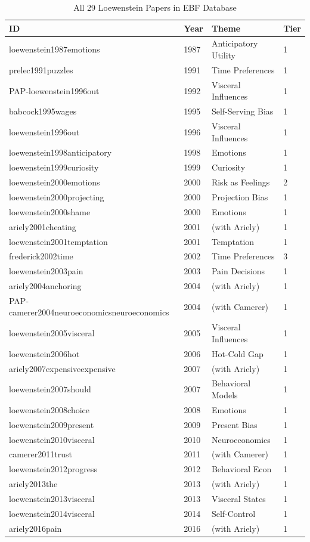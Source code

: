 \begin{table}[htbp]
\centering
\caption{All 29 Loewenstein Papers in EBF Database}
\label{tab:lo-papers}
\renewcommand{\arraystretch}{1.2}
\scriptsize
\begin{tabular}{@{}llll@{}}
\toprule
\textbf{ID} & \textbf{Year} & \textbf{Theme} & \textbf{Tier} \\
\midrule
loewenstein1987emotions & 1987 & Anticipatory Utility & 1 \\
prelec1991puzzles & 1991 & Time Preferences & 1 \\
PAP-loewenstein1996out & 1992 & Visceral Influences & 1 \\
babcock1995wages & 1995 & Self-Serving Bias & 1 \\
loewenstein1996out & 1996 & Visceral Influences & 1 \\
loewenstein1998anticipatory & 1998 & Emotions & 1 \\
loewenstein1999curiosity & 1999 & Curiosity & 1 \\
loewenstein2000emotions & 2000 & Risk as Feelings & 2 \\
loewenstein2000projecting & 2000 & Projection Bias & 1 \\
loewenstein2000shame & 2000 & Emotions & 1 \\
ariely2001cheating & 2001 & (with Ariely) & 1 \\
loewenstein2001temptation & 2001 & Temptation & 1 \\
frederick2002time & 2002 & Time Preferences & 3 \\
loewenstein2003pain & 2003 & Pain Decisions & 1 \\
ariely2004anchoring & 2004 & (with Ariely) & 1 \\
PAP-camerer2004neuroeconomicsneuroeconomics & 2004 & (with Camerer) & 1 \\
loewenstein2005visceral & 2005 & Visceral Influences & 1 \\
loewenstein2006hot & 2006 & Hot-Cold Gap & 1 \\
ariely2007expensiveexpensive & 2007 & (with Ariely) & 1 \\
loewenstein2007should & 2007 & Behavioral Models & 1 \\
loewenstein2008choice & 2008 & Emotions & 1 \\
loewenstein2009present & 2009 & Present Bias & 1 \\
loewenstein2010visceral & 2010 & Neuroeconomics & 1 \\
camerer2011trust & 2011 & (with Camerer) & 1 \\
loewenstein2012progress & 2012 & Behavioral Econ & 1 \\
ariely2013the & 2013 & (with Ariely) & 1 \\
loewenstein2013visceral & 2013 & Visceral States & 1 \\
loewenstein2014visceral & 2014 & Self-Control & 1 \\
ariely2016pain & 2016 & (with Ariely) & 1 \\
\bottomrule
\end{tabular}
\end{table}


